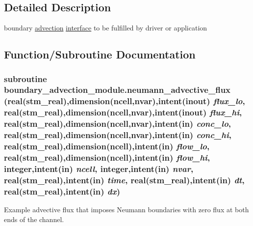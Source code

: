 \subsection{Detailed Description}
boundary \hyperlink{a00052}{advection} \hyperlink{a00004}{interface} to be fulfilled by driver or application 



\subsection{Function/Subroutine Documentation}
\hypertarget{a00053_be28f15b0eabbed1d1f745d2e27cbdc7}{
\subsubsection[{neumann\_\-advective\_\-flux}]{\setlength{\rightskip}{0pt plus 5cm}subroutine boundary\_\-advection\_\-module.neumann\_\-advective\_\-flux (real(stm\_\-real),dimension(ncell,nvar),intent(inout) {\em flux\_\-lo}, \/  real(stm\_\-real),dimension(ncell,nvar),intent(inout) {\em flux\_\-hi}, \/  real(stm\_\-real),dimension(ncell,nvar),intent(in) {\em conc\_\-lo}, \/  real(stm\_\-real),dimension(ncell,nvar),intent(in) {\em conc\_\-hi}, \/  real(stm\_\-real),dimension(ncell),intent(in) {\em flow\_\-lo}, \/  real(stm\_\-real),dimension(ncell),intent(in) {\em flow\_\-hi}, \/  integer,intent(in) {\em ncell}, \/  integer,intent(in) {\em nvar}, \/  real(stm\_\-real),intent(in) {\em time}, \/  real(stm\_\-real),intent(in) {\em dt}, \/  real(stm\_\-real),intent(in) {\em dx})}}
\label{a00053_be28f15b0eabbed1d1f745d2e27cbdc7}


Example advective flux that imposes Neumann boundaries with zero flux at both ends of the channel. 

